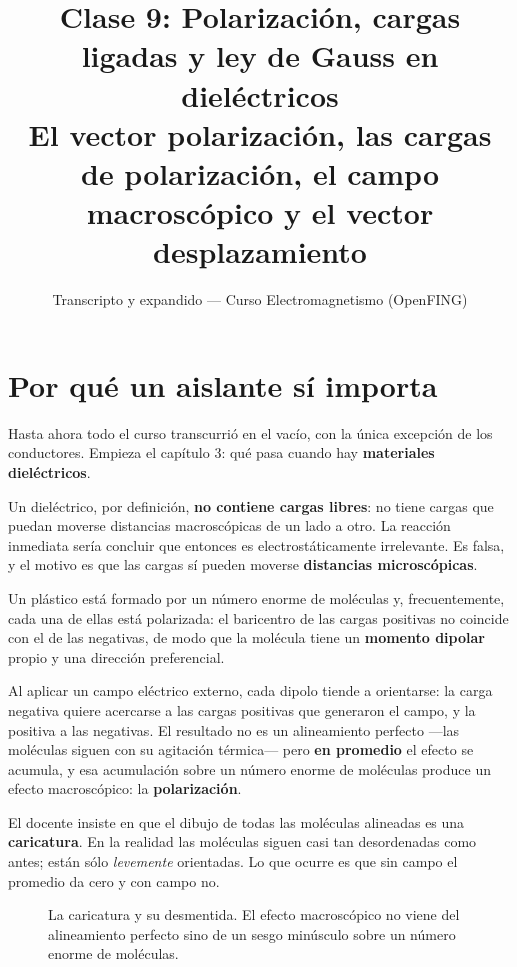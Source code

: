 \documentclass[12pt,a4paper]{article}
\title{\textbf{Clase 9: Polarización, cargas ligadas y ley de Gauss en dieléctricos} \\[0.3em]
        \large{El vector polarización, las cargas de polarización, el campo macroscópico y el vector desplazamiento}}
\author{Transcripto y expandido --- Curso Electromagnetismo (OpenFING)}
\date{}
\begin{document}
\maketitle
\thispagestyle{empty}
\newpage

\tableofcontents
\newpage

\section{Por qué un aislante sí importa}

Hasta ahora todo el curso transcurrió en el vacío, con la única excepción de los
conductores. Empieza el capítulo 3: qué pasa cuando hay \textbf{materiales
dieléctricos}.

Un dieléctrico, por definición, \textbf{no contiene cargas libres}: no tiene
cargas que puedan moverse distancias macroscópicas de un lado a otro. La reacción
inmediata sería concluir que entonces es electrostáticamente irrelevante. Es
falsa, y el motivo es que las cargas sí pueden moverse \textbf{distancias
microscópicas}.

Un plástico está formado por un número enorme de moléculas y, frecuentemente,
cada una de ellas está polarizada: el baricentro de las cargas positivas no
coincide con el de las negativas, de modo que la molécula tiene un \textbf{momento
dipolar} propio y una dirección preferencial.

Al aplicar un campo eléctrico externo, cada dipolo tiende a orientarse: la carga
negativa quiere acercarse a las cargas positivas que generaron el campo, y la
positiva a las negativas. El resultado no es un alineamiento perfecto ---las
moléculas siguen con su agitación térmica--- pero \textbf{en promedio} el efecto
se acumula, y esa acumulación sobre un número enorme de moléculas produce un
efecto macroscópico: la \textbf{polarización}.

\begin{warnbox}
El docente insiste en que el dibujo de todas las moléculas alineadas es una
\textbf{caricatura}. En la realidad las moléculas siguen casi tan desordenadas
como antes; están sólo \emph{levemente} orientadas. Lo que ocurre es que sin
campo el promedio da cero y con campo no.
\end{warnbox}

\begin{figure}[H]
  \centering
  
  \caption{La caricatura y su desmentida. El efecto macroscópico no viene del
  alineamiento perfecto sino de un sesgo minúsculo sobre un número enorme de
  moléculas.}
\end{figure}
\end{document}
